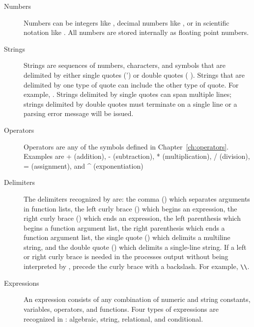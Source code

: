 \begin{description}
\item[Numbers] Numbers can be integers like , decimal numbers 
like , or in scientific notation like . All numbers 
are stored internally as floating point numbers.

\item[Strings] Strings are sequences of numbers, characters, and symbols 
that are delimited by either single quotes (') or double quotes ( ). Strings that are delimited by one type of quote
can include the other type of quote. For example, .  Strings delimited by single
quotes can span multiple lines; strings delimited by double quotes
must terminate on a single line or a parsing error message will be
issued.

\item[Operators] 
Operators are any of the symbols defined in
Chapter~\ref{ch:operators}. Examples are + (addition), -
(subtraction), * (multiplication), / (division), = (assignment), and
\textasciicircum{} (exponentiation)

\item[Delimiters] The delimiters recognized by \aprepro{} are: the 
comma (\cmd{,}) which separates arguments in function lists, the
left curly brace (\cmd{\{}) which begins an expression, the right
curly brace (\cmd{\}}) which ends an expression, the left parenthesis
\cmd{(} which begins a function argument list, the right
parenthesis \cmd{)} which ends a function argument list, the
single quote () which delimits a multiline string, and the double
quote () which delimits a single-line string. If a left
or right curly brace is needed in the processes output without being
interpreted by \aprepro{}, precede the curly brace with a backslash.
For example, \verb+\+\cmd{\{ }\verb+\+\cmd{\}}.

\item[Expressions] An expression consists of any combination of numeric 
and string constants, variables, operators, and functions. Four types
of expressions are recognized in \aprepro{}: algebraic, string,
relational, and conditional.


\end{description}
